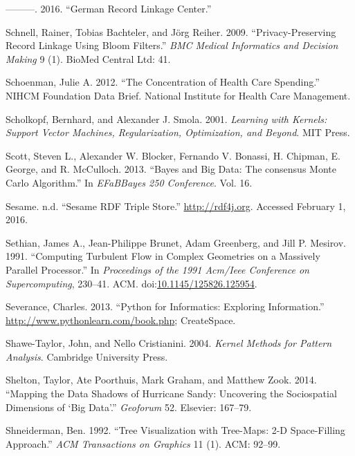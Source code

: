 \documentclass[]{krantz}
\begin{document}
\hypertarget{ref-Schnell2016}{}
---------. 2016. ``German Record Linkage Center.''

\hypertarget{ref-schnell2009privacy}{}
Schnell, Rainer, Tobias Bachteler, and Jörg Reiher. 2009.
``Privacy-Preserving Record Linkage Using Bloom Filters.'' \emph{BMC
Medical Informatics and Decision Making} 9 (1). BioMed Central Ltd: 41.

\hypertarget{ref-healthcarespending}{}
Schoenman, Julie A. 2012. ``The Concentration of Health Care Spending.''
NIHCM Foundation Data Brief. National Institute for Health Care
Management.

\hypertarget{ref-Scholkopf2001}{}
Scholkopf, Bernhard, and Alexander J. Smola. 2001. \emph{Learning with
Kernels: Support Vector Machines, Regularization, Optimization, and
Beyond}. MIT Press.

\hypertarget{ref-scott2013bayes}{}
Scott, Steven L., Alexander W. Blocker, Fernando V. Bonassi, H. Chipman,
E. George, and R. McCulloch. 2013. ``Bayes and Big Data: The consensus
Monte Carlo Algorithm.'' In \emph{EFaBBayes 250 Conference}. Vol. 16.

\hypertarget{ref-sesame}{}
Sesame. n.d. ``Sesame RDF Triple Store.'' \url{http://rdf4j.org}.
Accessed February 1, 2016.

\hypertarget{ref-bigdata_old1}{}
Sethian, James A., Jean-Philippe Brunet, Adam Greenberg, and Jill P.
Mesirov. 1991. ``Computing Turbulent Flow in Complex Geometries on a
Massively Parallel Processor.'' In \emph{Proceedings of the 1991
Acm/Ieee Conference on Supercomputing}, 230--41. ACM.
doi:\href{https://doi.org/10.1145/125826.125954}{10.1145/125826.125954}.

\hypertarget{ref-SeverancePython}{}
Severance, Charles. 2013. ``Python for Informatics: Exploring
Information.'' \url{http://www.pythonlearn.com/book.php}; CreateSpace.

\hypertarget{ref-ShaweTaylor2004}{}
Shawe-Taylor, John, and Nello Cristianini. 2004. \emph{Kernel Methods
for Pattern Analysis}. Cambridge University Press.

\hypertarget{ref-shelton2014mapping}{}
Shelton, Taylor, Ate Poorthuis, Mark Graham, and Matthew Zook. 2014.
``Mapping the Data Shadows of Hurricane Sandy: Uncovering the
Sociospatial Dimensions of `Big Data'.'' \emph{Geoforum} 52. Elsevier:
167--79.

\hypertarget{ref-shneiderman1992tree}{}
Shneiderman, Ben. 1992. ``Tree Visualization with Tree-Maps: 2-D
Space-Filling Approach.'' \emph{ACM Transactions on Graphics} 11 (1).
ACM: 92--99.
\end{document}
